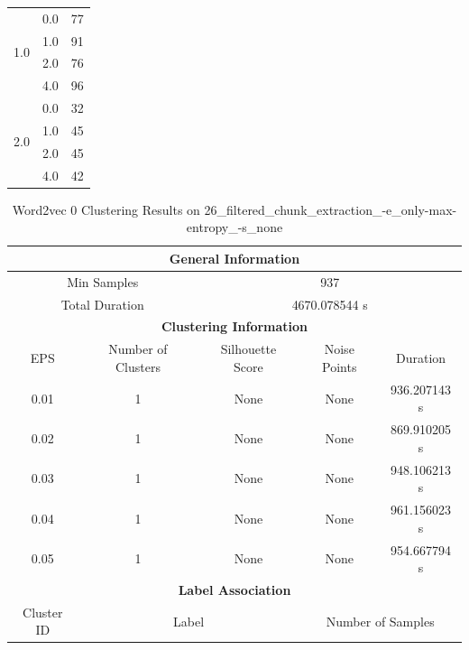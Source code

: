 \begin{longtable}{|c|c|c|c|c|}
\hline
\multirow{4}{*}{1.0} & \multicolumn{2}{c|}{0.0} & \multicolumn{2}{c|}{77} \\
& \multicolumn{2}{c|}{1.0} & \multicolumn{2}{c|}{91} \\
& \multicolumn{2}{c|}{2.0} & \multicolumn{2}{c|}{76} \\
& \multicolumn{2}{c|}{4.0} & \multicolumn{2}{c|}{96} \\
\hline
\multirow{4}{*}{2.0} & \multicolumn{2}{c|}{0.0} & \multicolumn{2}{c|}{32} \\
& \multicolumn{2}{c|}{1.0} & \multicolumn{2}{c|}{45} \\
& \multicolumn{2}{c|}{2.0} & \multicolumn{2}{c|}{45} \\
& \multicolumn{2}{c|}{4.0} & \multicolumn{2}{c|}{42} \\
\hline
\end{longtable}


\begin{longtable}{|c|c|c|c|c|}
\caption{Word2vec 0 Clustering Results on 26\_filtered\_chunk\_extraction\_-e\_only-max-entropy\_-s\_none} \label{tab:26_filtered_chunk_extraction_-e_only-max-entropy_-s_none_word2vec_0_clustering_results}\\
\hline
\multicolumn{5}{|c|}{\textbf{General Information}} \\
\hline
\multicolumn{2}{|c|}{Min Samples} & \multicolumn{3}{c|}{937} \\
\multicolumn{2}{|c|}{Total Duration} & \multicolumn{3}{c|}{4670.078544 s} \\
\hline
\multicolumn{5}{|c|}{\textbf{Clustering Information}} \\
\hline
EPS & Number of Clusters & Silhouette Score & Noise Points & Duration \\
0.01 & 1 & None & None & 936.207143 s\\
0.02 & 1 & None & None & 869.910205 s\\
0.03 & 1 & None & None & 948.106213 s\\
0.04 & 1 & None & None & 961.156023 s\\
0.05 & 1 & None & None & 954.667794 s\\
\hline
\multicolumn{5}{|c|}{\textbf{Label Association}} \\
\hline
Cluster ID & \multicolumn{2}{c|}{Label} & \multicolumn{2}{c|}{Number of Samples} \\
\hline
\end{longtable}


